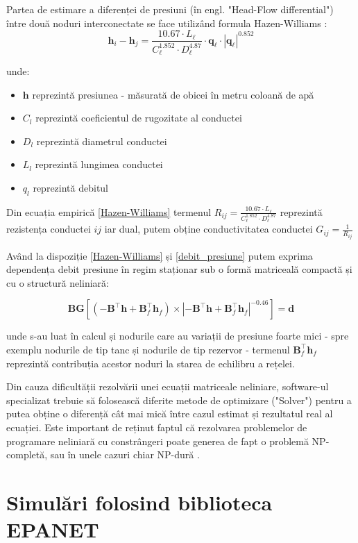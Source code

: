 Partea de estimare a diferenței de presiuni (în engl. "Head-Flow differential") între două noduri interconectate se face utilizând formula Hazen-Williams \cite{sanz2016demand}:
\begin{equation}
\label{debit_presiune}
\mathbf h_i-\mathbf h_j=\frac{10.67\cdot L_\ell}{C_\ell^{1.852}\cdot D_\ell^{4.87}}\cdot \mathbf q_\ell\cdot |\mathbf q_\ell|^{0.852}
\end{equation}

unde:
\begin{itemize}
\label{Hazen-Williams}
\item $\textbf{h}$ reprezintă presiunea - măsurată de obicei în metru coloană de apă
\item $C_l$  reprezintă coeficientul de rugozitate al conductei
\item $D_l$ reprezintă diametrul conductei
\item $L_l$ reprezintă lungimea conductei
\item $q_l$ reprezintă debitul
\end{itemize}

Din ecuația empirică \eqref{Hazen-Williams} termenul $R_{ij}=\frac{10.67\cdot L_\ell}{C_\ell^{1.852}\cdot D_\ell^{4.87}}$ reprezintă rezistența conductei $ij$ iar dual, putem obține conductivitatea conductei $G_{ij} = \frac{1}{R_{ij}}$

Având la dispoziție \eqref{Hazen-Williams} și \eqref{debit_presiune} putem exprima dependența debit presiune în regim staționar sub o formă matriceală compactă și cu o structură neliniară:

\begin{equation}
\mathbf B\mathbf G\left[\left(-\mathbf B^\top \mathbf h+\mathbf B_f^\top \mathbf h_f\right)\times \left|-\mathbf B^\top \mathbf h+\mathbf B_f^\top \mathbf h_f\right|^{-0.46}\right]=\mathbf d
\end{equation}

unde s-au luat în calcul și nodurile care au variații de presiune foarte mici - spre exemplu nodurile de tip tanc și  nodurile de tip rezervor - termenul $\mathbf B_f^\top \mathbf h_f$ reprezintă contribuția acestor noduri la starea de echilibru a rețelei.

Din cauza dificultății rezolvării unei ecuații matriceale neliniare, software-ul specializat trebuie să folosească diferite metode de optimizare ("Solver") pentru a putea obține o diferență cât mai mică între cazul estimat și rezultatul real al ecuației. Este important de reținut faptul că rezolvarea problemelor de programare neliniară cu constrângeri poate generea de fapt o problemă NP-completă, sau în unele cazuri chiar NP-dură \cite{karp1975computational}.

\section{Simulări folosind biblioteca EPANET}